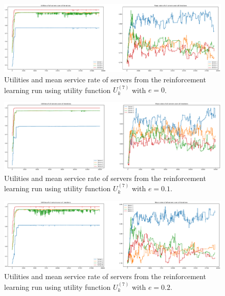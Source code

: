 \begin{figure}[H]
    \includegraphics[width=\textwidth]{chapters/00_appendix/03_more_rl_results/Bin/utility_7_eps/u7_1_e0.eps}
    \caption{Utilities and mean service rate of servers from the reinforcement
    learning run using utility function \(U_k^{(7)}\) with \(e = 0\).}
    \label{fig:RL_utility7_1_e0}
\end{figure}

\begin{figure}[H]
    \includegraphics[width=\textwidth]{chapters/00_appendix/03_more_rl_results/Bin/utility_7_eps/u7_1_e01.eps}
    \caption{Utilities and mean service rate of servers from the reinforcement
    learning run using utility function \(U_k^{(7)}\) with \(e = 0.1\).}
    \label{fig:RL_utility7_1_e01}
\end{figure}

\begin{figure}[H]
    \includegraphics[width=\textwidth]{chapters/00_appendix/03_more_rl_results/Bin/utility_7_eps/u7_1_e02.eps}
    \caption{Utilities and mean service rate of servers from the reinforcement
    learning run using utility function \(U_k^{(7)}\) with \(e = 0.2\).}
    \label{fig:RL_utility7_1_e02}
\end{figure}

